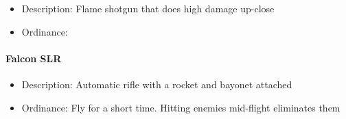 \documentclass[../Main.tex]{subfiles}
\begin{document}
\begin{itemize}
	\item Description: Flame shotgun that does high damage up-close
	\item Ordinance: 
\end{itemize} 

\paragraph{Falcon SLR}

\begin{itemize}
	\item Description: Automatic rifle with a rocket and bayonet attached
	\item Ordinance: Fly for a short time. Hitting enemies mid-flight eliminates them
\end{itemize} 
\end{document}
